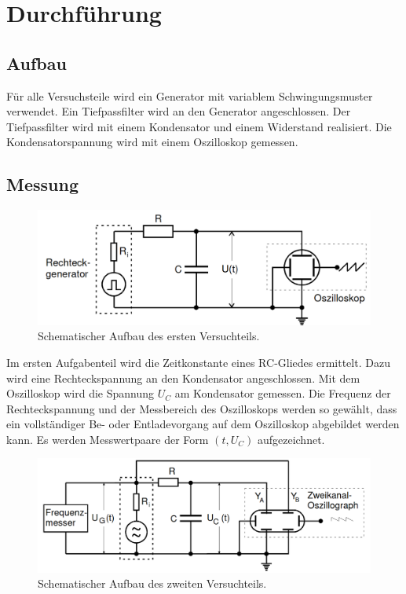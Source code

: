\section{Durchführung}
\label{sec:Durchführung}


\subsection{Aufbau}
\label{sec:Aufbau}

Für alle Versuchsteile wird ein Generator mit variablem Schwingungsmuster verwendet. Ein Tiefpassfilter wird an den Generator angeschlossen.
Der Tiefpassfilter wird mit einem Kondensator und einem Widerstand realisiert. Die Kondensatorspannung wird mit einem Oszilloskop gemessen.

\subsection{Messung}
\label{sec:Messung}

\begin{figure}[h!]
    \centering
    \includegraphics[width=\linewidth]{img/Aufbau1.png}
    \caption{Schematischer Aufbau des ersten Versuchteils.\cite{V353}}
    \label{fig:Aufbau1}
\end{figure}

Im ersten Aufgabenteil wird die Zeitkonstante eines RC-Gliedes ermittelt.
Dazu wird eine Rechteckspannung an den Kondensator angeschlossen. Mit dem Oszilloskop wird die Spannung $U_C$ am Kondensator gemessen. %
Die Frequenz der Rechteckspannung und der Messbereich des Oszilloskops werden so gewählt, dass ein vollständiger Be- oder Entladevorgang
auf dem Oszilloskop abgebildet werden kann. Es werden Messwertpaare der Form $(t, U_C)$ aufgezeichnet.\\

\begin{figure}[h!]
    \centering
    \includegraphics[width=\linewidth]{img/Aufbau2.png}
    \caption{Schematischer Aufbau des zweiten Versuchteils.\cite{V353}}
    \label{fig:Aufbau2}
\end{figure}

